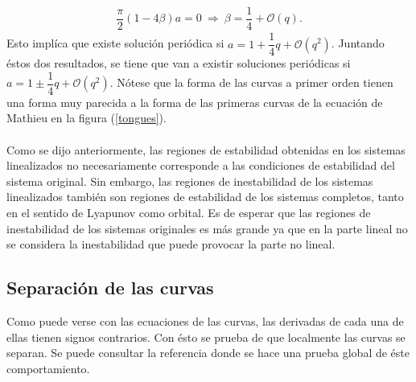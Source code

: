 \begin{eqnarray}
\dfrac{\pi}{2}(1-4\beta)a=0 \ \Longrightarrow \ \beta = \dfrac{1}{4} + \mathcal{O}(q).
\end{eqnarray}
Esto implíca que existe solución periódica si $a=1+\dfrac{1}{4}q+\mathcal{O}(q^{2})$. Juntando éstos dos resultados, se tiene que van a existir soluciones periódicas si $a=1\pm \dfrac{1}{4}q + \mathcal{O}(q^{2})$. Nótese que la forma de las curvas a primer orden tienen una forma muy parecida a la forma de las primeras curvas de la ecuación de Mathieu en la figura (\ref{tongues}).
\\
\\
Como se dijo anteriormente, las regiones de estabilidad obtenidas en los sistemas linealizados no necesariamente corresponde a las condiciones de estabilidad del sistema original. Sin embargo, las regiones de inestabilidad de los sistemas linealizados también son regiones de estabilidad de los sistemas completos, tanto en el sentido de Lyapunov como orbital. Es de esperar que las regiones de inestabilidad de los sistemas originales es más grande ya que en la parte lineal no se considera la inestabilidad que puede provocar la parte no lineal.
\subsection{Separación de las curvas}
Como puede verse con las ecuaciones de las curvas, las derivadas de cada una de ellas tienen signos contrarios. Con ésto se prueba de que localmente las curvas se separan. Se puede consultar la referencia \citep{ize} donde se hace una prueba global de éste comportamiento.
